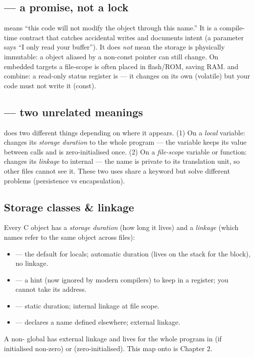 \subsection{ --- a promise, not a lock}

 means ``this code will not modify the object through this name.''
It is a compile-time contract that catches accidental writes and documents
intent (a  parameter says ``I only read your buffer''). It does
\emph{not} mean the storage is physically immutable: a  object
aliased by a non-const pointer can still change. On embedded targets a
file-scope  is often placed in flash/ROM, saving RAM. 
and  combine: a read-only status register is
 --- it changes on its own (volatile) but your code must
not write it (const).

\subsection{ --- two unrelated meanings}

 does two different things depending on where it appears.
(1) On a \emph{local} variable: changes its \emph{storage duration} to the
whole program --- the variable keeps its value between calls and is
zero-initialised once. (2) On a \emph{file-scope} variable or function:
changes its \emph{linkage} to internal --- the name is private to its
translation unit, so other files cannot see it. These two uses share a keyword
but solve different problems (persistence vs encapsulation).

\subsection{Storage classes \& linkage}

Every C object has a \emph{storage duration} (how long it lives) and a
\emph{linkage} (which names refer to the same object across files):
\begin{itemize}
\item {} --- the default for locals; automatic duration (lives on the
  stack for the block), no linkage.
\item {} --- a hint (now ignored by modern compilers) to keep in
  a register; you cannot take its address.
\item {} --- static duration; internal linkage at file scope.
\item {} --- declares a name defined elsewhere; external linkage.
\end{itemize}
A non- global has external linkage and lives for the whole
program in  (if initialised non-zero) or 
(zero-initialised). This map onto  is Chapter 2.

